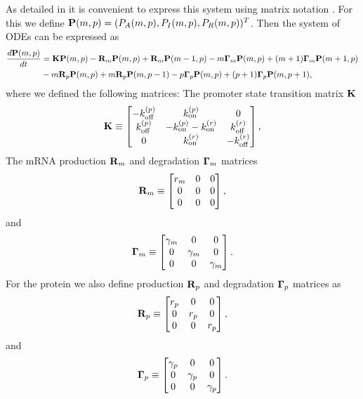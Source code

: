 As detailed in  it is convenient to express this system using
matrix notation \cite{Sanchez2013}. For this we define $\mathbf{P}(m, p) = (P_A(m, p),
P_I(m, p), P_R(m, p))^T$. Then the system of ODEs can be expressed as
\begin{equation}
  \begin{aligned}
    {d{\mathbf{P}(m, p)} \over dt} &= \mathbf{K} \mathbf{P}(m, p)
    - \mathbf{R}_m \mathbf{P}(m, p) + \mathbf{R}_m \mathbf{P}(m-1, p)
    - m \mathbf{\Gamma}_m \mathbf{P}(m, p) + (m + 1) \mathbf{\Gamma}_m \mathbf{P}(m + 1, p)\\
    &- m \mathbf{R}_p \mathbf{P}(m, p) + m \mathbf{R}_p \mathbf{P}(m, p - 1)
    - p \mathbf{\Gamma}_p \mathbf{P}(m, p) + (p + 1) \mathbf{\Gamma}_p \mathbf{P}(m, p + 1),
  \end{aligned}
\end{equation}
where we defined the following matrices: The promoter state transition matrix
$\mathbf{K}$
\begin{align}
  \mathbf{K} \equiv
  \begin{bmatrix}
    -k^{(p)}_{\text{off}}   & k^{(p)}_{\text{on}}         & 0\\
    k^{(p)}_{\text{off}}    & -k^{(p)}_{\text{on}} -k^{(r)}_{\text{on}}  & k^{(r)}_{\text{off}}\\
    0         & k^{(r)}_{\text{on}}         & -k^{(r)}_{\text{off}}
  \end{bmatrix},
\end{align}
The mRNA production $\mathbf{R}_m$ and degradation $\mathbf{\Gamma}_m$ matrices
\begin{equation}
  \mathbf{R}_m \equiv
  \begin{bmatrix}
    r_m   & 0 & 0\\
    0     & 0 & 0\\
    0     & 0 & 0\\
  \end{bmatrix},
\end{equation}
and
\begin{equation}
  \mathbf{\Gamma}_m \equiv
  \begin{bmatrix}
    \gamma _m   & 0   & 0\\
    0     & \gamma _m & 0\\
    0     & 0   & \gamma _m\\
  \end{bmatrix}.
\end{equation}
For the protein we also define production $\mathbf{R}_p$ and degradation $\mathbf{\Gamma}_p$ matrices
as
\begin{equation}
  \mathbf{R}_p \equiv
  \begin{bmatrix}
    r_p   & 0   & 0\\
    0     & r_p & 0\\
    0     & 0   & r_p\\
  \end{bmatrix},
\end{equation}
and
\begin{equation}
  \mathbf{\Gamma}_p \equiv
  \begin{bmatrix}
    \gamma _p   & 0   & 0\\
    0     & \gamma _p & 0\\
    0     & 0   & \gamma _p\\
  \end{bmatrix}.
\end{equation}

